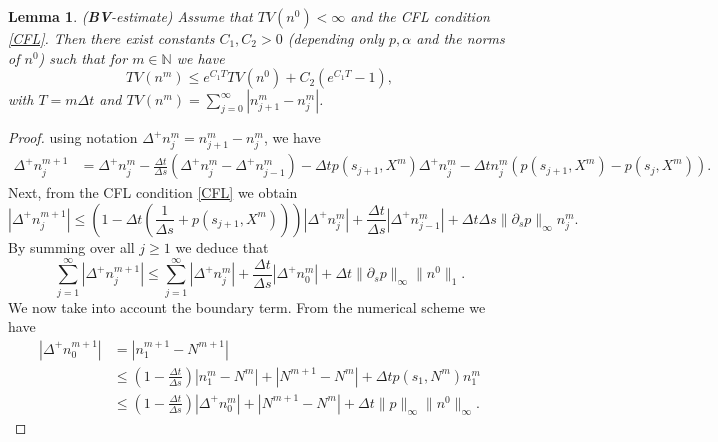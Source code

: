 \documentclass[11pt,a4paper]{article}
\newcommand{\N}{\mathbb{N}}
\newtheorem{lemma}{Lemma}[section]
\begin{document}
\begin{lemma}{(\textbf{BV}-estimate)}
\label{BV-lem-d}
Assume that $TV(n^0)<\infty$ and the CFL condition \eqref{CFL}. Then there exist constants $C_1,C_2>0$ (depending only $p,\alpha$ and the norms of $n^0$) such that for $m\in\N$ we have
\begin{equation}
    TV(n^m)\le e^{C_1T} TV(n^0)+C_2(e^{C_1T}-1),
    \label{BV_estimate-d}
\end{equation}
with  $T=m\Delta t$ and $TV(n^m)= \displaystyle\sum_{j=0}^\infty|n_{j+1}^{m}-n_{j}^{m}|$.
\end{lemma}
\begin{proof}
using notation $\Delta^{+}n_j^m=n_{j+1}^{m}-n_{j}^{m}$, we have
\begin{equation*}
    \begin{split}
      \Delta^{+}n_j^{m+1}&=  \Delta^{+}n_j^{m}-\frac{\Delta t}{\Delta s}\left(\Delta^{+}n_j^{m}-\Delta^{+}n_{j-1}^{m}\right)-\Delta t p(s_{j+1},X^m)\Delta^{+}n_j^{m}
       -\Delta t n_j^m(p(s_{j+1},X^m)-p(s_{j},X^m)).
    \end{split}
\end{equation*}
Next, from the CFL condition \eqref{CFL} we obtain
\begin{equation*}
     |\Delta^{+}n_j^{m+1}| \le \left(1-\Delta t\left( \frac{1}{\Delta s}+p(s_{j+1},X^m) \right) \right)|\Delta^{+}n_j^{m}|
     +\frac{\Delta t}{\Delta s}|\Delta^{+}n_{j-1}^{m}|+\Delta t\Delta s\|\partial_s p\|_\infty n_j^m.
\end{equation*}
By summing over all $j\ge 1$ we deduce that
\begin{equation}
\label{Delta+nm}
\sum_{j=1}^\infty|\Delta^{+}n_j^{m+1}|\le
\sum_{j=1}^\infty|\Delta^{+}n_j^{m}|
+ \frac{\Delta t}{\Delta s} |\Delta^{+}n_{0}^{m}|+\Delta t\|\partial_s p\|_\infty\|n^0\|_1. 
\end{equation}
We now take into account the boundary term. From the numerical scheme we have
\begin{equation*}
\label{Delta+n0-d}
\begin{split}
     |\Delta^{+}n_0^{m+1}| & = |n_1^{m+1}-N^{m+1}|\\
     & \le \left(1-\frac{\Delta t}{\Delta s}\right)|n_1^m-N^m|+  |N^{m+1}- N^m|+\Delta t p(s_1,N^m) n^m_1\\
     &\le \left(1-\frac{\Delta t}{\Delta s}\right)|\Delta^+ n_0^m|+  |N^{m+1}-N^m|+\Delta t \|p\|_\infty \|n^0\|_\infty.
\end{split} 
\end{equation*}


\end{proof}
\end{document}
